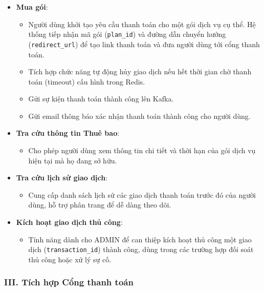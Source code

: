 \begin{itemize}
\item \textbf{Mua gói}:
\begin{itemize}
\item Người dùng khởi tạo yêu cầu thanh toán cho một gói dịch vụ cụ thể. Hệ thống tiếp nhận mã gói (\texttt{plan\_id}) và đường dẫn chuyển hướng (\texttt{redirect\_url}) để tạo link thanh toán và đưa người dùng tới cổng thanh toán.
\item Tích hợp chức năng tự động hủy giao dịch nếu hết thời gian chờ thanh toán (timeout) cấu hình trong Redis.
\item Gửi sự kiện thanh toán thành công lên Kafka.
\item Gửi email thông báo xác nhận thanh toán thành công cho người dùng.
\end{itemize}

\item \textbf{Tra cứu thông tin Thuê bao}:
\begin{itemize}
\item Cho phép người dùng xem thông tin chi tiết và thời hạn của gói dịch vụ hiện tại mà họ đang sở hữu.
\end{itemize}

\item \textbf{Tra cứu lịch sử giao dịch}:
\begin{itemize}
\item Cung cấp danh sách lịch sử các giao dịch thanh toán trước đó của người dùng, hỗ trợ phân trang để dễ dàng theo dõi.
\end{itemize}

\item \textbf{Kích hoạt giao dịch thủ công}:
\begin{itemize}
\item Tính năng dành cho ADMIN để can thiệp kích hoạt thủ công một giao dịch (\texttt{transaction\_id}) thành công, dùng trong các trường hợp đối soát thủ công hoặc xử lý sự cố.
\end{itemize}
\end{itemize}

\subsubsection{III. Tích hợp Cổng thanh toán}

